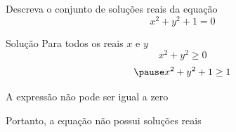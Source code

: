 \begin{question}
  Descreva o conjunto de soluções reais da equação
  \[
    x^2+y^2+1=0
  \]
\end{question}

\begin{resolution}{Solução}
  Para todos os reais \(x\) e \(y\)
  \[
    x^2 + y^2 \geq 0
  \]
  \[
    \pause
    x^2 + y^2 + 1 \geq 1
  \]

  \pause
  A expressão não pode ser igual a zero

  \pause
  Portanto, a equação não possui soluções reais
\end{resolution}

\endinput
